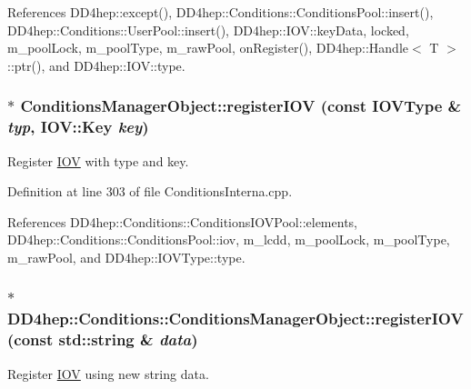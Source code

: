 References DD4hep::except(), DD4hep::Conditions::ConditionsPool::insert(), DD4hep::Conditions::UserPool::insert(), DD4hep::IOV::keyData, locked, m\_\-poolLock, m\_\-poolType, m\_\-rawPool, onRegister(), DD4hep::Handle$<$ T $>$::ptr(), and DD4hep::IOV::type.\hypertarget{class_d_d4hep_1_1_conditions_1_1_conditions_manager_object_ac6647d16096a5fccda601eada638e13b}{
\subsubsection[{registerIOV}]{ $\ast$ ConditionsManagerObject::registerIOV (const {\bf IOVType} \& {\em typ}, \/  {\bf IOV::Key} {\em key})}}
\label{class_d_d4hep_1_1_conditions_1_1_conditions_manager_object_ac6647d16096a5fccda601eada638e13b}


Register \hyperlink{class_d_d4hep_1_1_i_o_v}{IOV} with type and key. 

Definition at line 303 of file ConditionsInterna.cpp.

References DD4hep::Conditions::ConditionsIOVPool::elements, DD4hep::Conditions::ConditionsPool::iov, m\_\-lcdd, m\_\-poolLock, m\_\-poolType, m\_\-rawPool, and DD4hep::IOVType::type.\hypertarget{class_d_d4hep_1_1_conditions_1_1_conditions_manager_object_aead446d145420ab3f6e48c74194dff05}{
\subsubsection[{registerIOV}]{$\ast$ DD4hep::Conditions::ConditionsManagerObject::registerIOV (const std::string \& {\em data})}}
\label{class_d_d4hep_1_1_conditions_1_1_conditions_manager_object_aead446d145420ab3f6e48c74194dff05}


Register \hyperlink{class_d_d4hep_1_1_i_o_v}{IOV} using new string data. 

